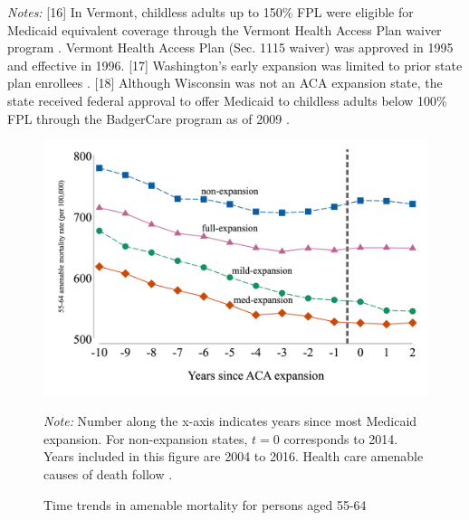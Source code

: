 \documentclass[12pt]{article}%
\begin{document}
\begin{appendices}
\begin{table}[]
\begin{adjustbox}{width=.99\textwidth}
\begin{tabular}{@{}llllllll@{}}
\end{tabular}
\end{adjustbox}
\begin{scriptsize}
 \begin{justify}
   \textit{Notes:} [16] In Vermont, childless adults up to 150\% FPL were eligible for Medicaid equivalent coverage through the Vermont Health Access Plan waiver program \citep{heberleinHoldingSteadyLooking2011}. Vermont Health Access Plan (Sec. 1115 waiver) was approved in 1995 and effective in 1996.
[17] Washington’s early expansion was limited to prior state plan enrollees \citep{sommersACAgainsInYoungAdult2013}.
[18] Although Wisconsin was not an ACA expansion state, the state received federal approval to offer Medicaid to childless adults below 100\% FPL through the BadgerCare program as of 2009 \citep{gatesWisconsinBadgerCareProgram2014}.
\end{justify}
 \end{scriptsize}
\end{table}

   \begin{figure}[H]
    \caption{Time trends in amenable mortality for persons aged 55-64}
    \begin{minipage}{.75\linewidth}
    \centering
      \includegraphics[width=\linewidth]{../output/figures/figure_1_raw_data.png}
       \begin{justify}
                {\footnotesize
                    \emph{Note:} 
                Number along the x-axis indicates years since most Medicaid expansion. 
                For non-expansion states, $t = 0$ corresponds to 2014. 
                Years included in this figure are 2004 to 2016. 
                Health care amenable causes of death follow \citet{Nolte1129}.
                \par}
            \end{justify}
             \label{fig:raw_data}
       \end{minipage}
    \end{figure}


\end{appendices}
\end{document}
